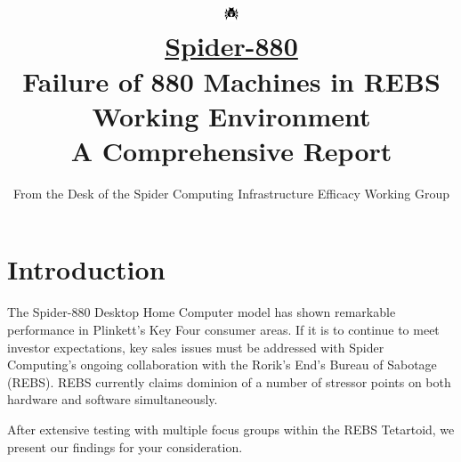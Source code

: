 \documentclass{article}
\title{
\href{https://ambiguousname.itch.io/spider-880}{\includegraphics[scale=5]{../src/icon.png}} \\
\href{https://ambiguousname.itch.io/spider-880}{Spider-880} \\
\large Failure of 880 Machines in REBS Working Environment \\
A Comprehensive Report
}
\author{From the Desk of the Spider Computing Infrastructure Efficacy Working Group}
\date{}
\begin{document}
\maketitle


\section{Introduction}
The Spider-880 Desktop Home Computer model has shown remarkable performance in Plinkett's Key Four consumer areas. If it is to continue to meet investor expectations, key sales issues must be addressed with Spider Computing's ongoing collaboration with the Rorik's End's Bureau of Sabotage (REBS). REBS currently claims dominion of a number of stressor points on both hardware and software simultaneously.

After extensive testing with multiple focus groups within the REBS Tetartoid, we present our findings for your consideration.
\end{document}
